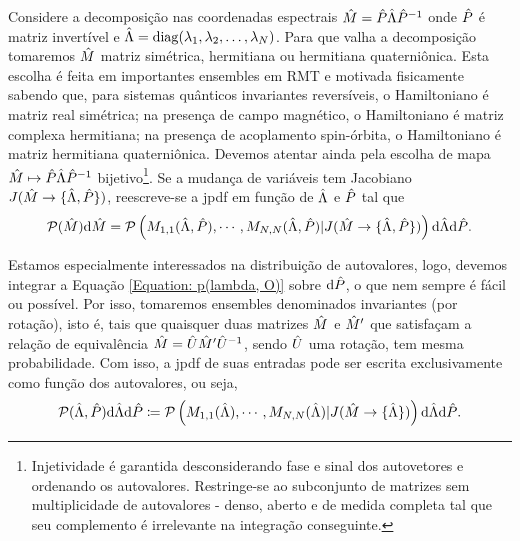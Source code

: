 \documentclass[12pt]{report}
\begin{document}
Considere a decomposição nas coordenadas espectrais $\hat M = \hat P \hat\Lambda \hat P^{-1}$ onde $\hat P$ é matriz invertível e $\hat\Lambda = \operatorname{diag}(\lambda_1, \lambda_2, \dots, \lambda_N)$. Para que valha a decomposição tomaremos $\hat M$ matriz simétrica, hermitiana ou hermitiana quaterniônica. Esta escolha é feita em importantes ensembles em RMT e motivada fisicamente sabendo que, para sistemas quânticos invariantes reversíveis, o Hamiltoniano é matriz real simétrica; na presença de campo magnético, o Hamiltoniano é matriz complexa hermitiana; na presença de acoplamento spin-órbita, o Hamiltoniano é matriz hermitiana quaterniônica. \cite[Capítulo~2]{RMT-firstcourse-Potters} Devemos atentar ainda pela escolha de mapa $\hat M \mapsto \hat P \hat\Lambda \hat P^{-1}$ bijetivo\footnote{Injetividade é garantida desconsiderando fase e sinal dos autovetores e ordenando os autovalores. Restringe-se ao subconjunto de matrizes sem multiplicidade de autovalores - denso, aberto e de medida completa tal que seu complemento é irrelevante na integração conseguinte.}. Se a mudança de variáveis tem Jacobiano $J(\hat M \rightarrow \{ \hat\Lambda, \hat P \} )$, reescreve-se a jpdf em função de $\hat\Lambda$ e $\hat P$ tal que
\begin{equation}
	\mathcal{P}(\hat{M}) \mathrm{d} \hat M = \mathcal{P} \left( M_{1,1}(\hat\Lambda, \hat P), \cdots, M_{N,N}(\hat\Lambda, \hat P) | J(\hat M \rightarrow \{ \hat\Lambda, \hat P \} ) \right) \mathrm{d} \hat\Lambda \mathrm{d} \hat P.
	\label{Equation: p(lambda, O)}
\end{equation}

Estamos especialmente interessados na distribuição de autovalores, logo, devemos integrar a Equação \eqref{Equation: p(lambda, O)} sobre $\mathrm{d} \hat P$, o que nem sempre é fácil ou possível. Por isso, tomaremos ensembles denominados invariantes (por rotação), isto é, tais que quaisquer duas matrizes $\hat M$ e $\hat M'$ que satisfaçam a relação de equivalência $\hat M = \hat U \hat M' \hat U^{-1}$, sendo $\hat U$ uma rotação, tem mesma probabilidade. Com isso, a jpdf de suas entradas pode ser escrita exclusivamente como função dos autovalores, ou seja, $$\mathcal{P}(\hat\Lambda, \hat P) \mathrm{d} \hat\Lambda \mathrm{d} \hat P \coloneqq \mathcal{P} \left( M_{1,1}( \hat\Lambda), \cdots, M_{N,N}(\hat\Lambda) | J(\hat M \rightarrow \{\hat\Lambda\} ) \right) \mathrm{d} \hat\Lambda \mathrm{d} \hat P.$$
\end{document}
